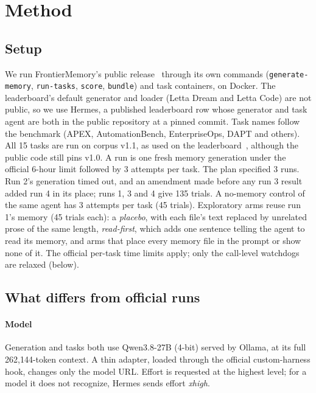 \section{Method}
\label{sec:method}

\subsection{Setup}
We run FrontierMemory's public release~\cite{frontiermemory,frontiermemory-code} through its own commands (\texttt{generate-memory}, \texttt{run-tasks}, \texttt{score}, \texttt{bundle}) and task containers, on Docker.
The leaderboard's default generator and loader (Letta Dream and Letta Code) are not public, so we use Hermes, a published leaderboard row whose generator and task agent are both in the public repository at a pinned commit.
Task names follow the benchmark (APEX, AutomationBench, EnterpriseOps, DAPT and others). All 15 tasks are run on corpus v1.1, as used on the leaderboard~\cite{frontiermemory-changelog}, although the public code still pins v1.0.
A run is one fresh memory generation under the official 6-hour limit followed by 3 attempts per task. The plan specified 3 runs. Run 2's generation timed out, and an amendment made before any run 3 result added run 4 in its place; runs 1, 3 and 4 give 135 trials. A no-memory control of the same agent has 3 attempts per task (45 trials).
Exploratory arms reuse run 1's memory (45 trials each): a \emph{placebo}, with each file's text replaced by unrelated prose of the same length, \emph{read-first}, which adds one sentence telling the agent to read its memory, and arms that place every memory file in the prompt or show none of it.
The official per-task time limits apply; only the call-level watchdogs are relaxed (below).

\subsection{What differs from official runs}
\paragraph{Model} Generation and tasks both use Qwen3.8-27B (4-bit) served by Ollama, at its full 262{,}144-token context. A thin adapter, loaded through the official custom-harness hook, changes only the model URL. Effort is requested at the highest level; for a model it does not recognize, Hermes sends effort \emph{xhigh}.

